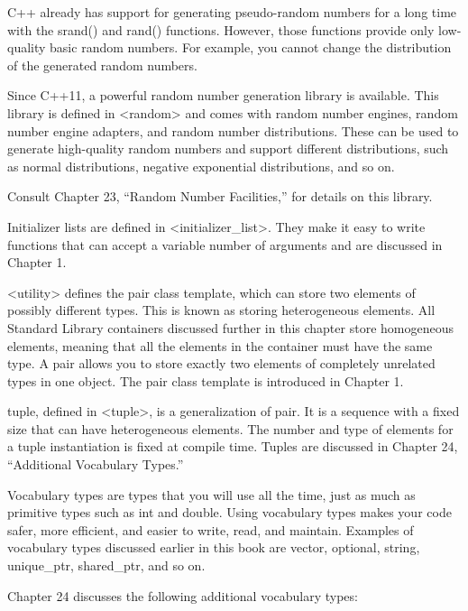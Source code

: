 C++ already has support for generating pseudo-random numbers for a long time with the srand() and rand() functions. However, those functions provide only low-quality basic random numbers. For example, you cannot change the distribution of the generated random numbers.

Since C++11, a powerful random number generation library is available. This library is defined in <random> and comes with random number engines, random number engine adapters, and random number distributions. These can be used to generate high-quality random numbers and support different distributions, such as normal distributions, negative exponential distributions, and so on.

Consult Chapter 23, “Random Number Facilities,” for details on this library.


Initializer lists are defined in <initializer\_list>. They make it easy to write functions that can accept a variable number of arguments and are discussed in Chapter 1.


<utility> defines the pair class template, which can store two elements of possibly different types. This is known as storing heterogeneous elements. All Standard Library containers discussed further in this chapter store homogeneous elements, meaning that all the elements in the container must have the same type. A pair allows you to store exactly two elements of completely unrelated types in one object. The pair class template is introduced in Chapter 1.

tuple, defined in <tuple>, is a generalization of pair. It is a sequence with a fixed size that can have heterogeneous elements. The number and type of elements for a tuple instantiation is fixed at compile time. Tuples are discussed in Chapter 24, “Additional Vocabulary Types.”


Vocabulary types are types that you will use all the time, just as much as primitive types such as int and double. Using vocabulary types makes your code safer, more efficient, and easier to write, read, and maintain. Examples of vocabulary types discussed earlier in this book are vector, optional, string, unique\_ptr, shared\_ptr, and so on.

Chapter 24 discusses the following additional vocabulary types:


